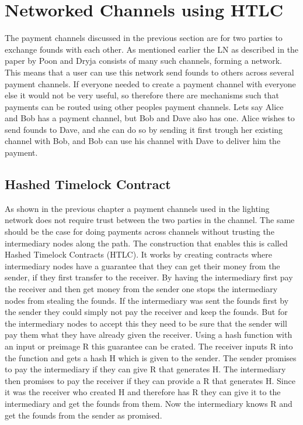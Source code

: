 \documentclass[informationsecurity]{gucmasterproject}
\begin{document}
\chapter{Networked Channels using HTLC}

The payment channels discussed in the previous section are for two parties to exchange founds with each other.
As mentioned earlier the LN as described in the paper by Poon and Dryja \cite{poon2015bitcoin} consists of many such channels, forming a network. This means that a user can use this network send founds to others across several payment channels. If everyone needed to create a payment channel with everyone else it would not be very useful, so therefore there are mechanisms such that payments can be routed using other peoples payment channels. Lets say Alice and Bob has a payment channel, but Bob and Dave also has one. Alice wishes to send founds to Dave, and she can do so by sending it first trough her existing channel with Bob, and Bob can use his channel with Dave to deliver him the payment.

\section{Hashed Timelock Contract}

As shown in the previous chapter a payment channels used in the lighting network does not require trust between the two parties in the channel. The same should be the case for doing payments across channels without trusting the intermediary nodes along the path. The construction that enables this is called Hashed Timelock Contracts (HTLC).
It works by creating contracts where intermediary nodes have a guarantee that they can get their money from the sender, if they first transfer to the receiver. By having the intermediary first pay the receiver and then get money from the sender one stops the intermediary nodes from stealing the founds. If the intermediary was sent the founds first by the sender they could simply not pay the receiver and keep the founds. But for the intermediary nodes to accept this they need to be sure that the sender will pay them what they have already given the receiver. Using a hash function with an input or preimage R this guarantee can be crated. The receiver inputs R into the function and gets a hash H which is given to the sender. The sender promises to pay the intermediary if they can give R that generates H. The intermediary then promises to pay the receiver if they can provide a R that generates H. Since it was the receiver who created H and therefore has R they can give it to the intermediary and get the founds from them. Now the intermediary knows R and get the founds from the sender as promised.
\end{document}
